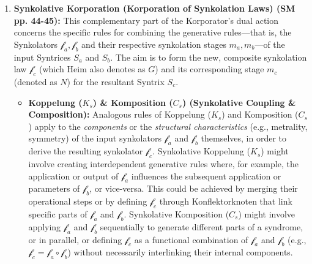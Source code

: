 \documentclass[12pt]{article}
\newcommand{\metrophor}{\bm{\widetilde{a}}}
\newcommand{\synkolator}{\mathcal{f}}
\newcommand{\synkolationsstufe}{m}
\newcommand{\aspektivsystem}{P}
\newcommand{\subjektiveraspekt}{S}
\begin{document}
\begin{itemize}
\begin{enumerate}
\begin{itemize}
            \item \textbf{Notation for Metrophorkorporation (SM p. 44):} Heim denotes the metrophoric part of the overall corporation process using the notation \( \metrophor_a \{K_m C_m\} \metrophor_b, \overline{|\aspektivsystem_C \subjektiveraspekt|}_\gamma, \metrophor_c \). The operator matrix \( \{K_m C_m\} \) here signifies the combined set of metrophoric rules being applied. In the context of the full \( 2 \times 2 \) Korporator operator matrix (as will be shown in Eq. \eqref{eq:korporator_matrix_original}), the Koppelung rule \( K_m \) is conventionally placed in the bottom-left position, and the Komposition rule \( C_m \) is placed in the bottom-right position.
        \end{itemize}

        \item \textbf{Synkolative Korporation (Korporation of Synkolation Laws) (SM pp. 44-45):} This complementary part of the Korporator's dual action concerns the specific rules for combining the generative rules—that is, the Synkolators \( \synkolator_a, \synkolator_b \) and their respective synkolation stages \( \synkolationsstufe_a, \synkolationsstufe_b \)—of the input Syntrices \( S_a \) and \( S_b \). The aim is to form the new, composite synkolation law \( \synkolator_c \) (which Heim also denotes as \(G\)) and its corresponding stage \( \synkolationsstufe_c \) (denoted as \(N\)) for the resultant Syntrix \( S_c \).
        \begin{itemize}
            \item \textbf{Koppelung (\( K_s \)) \& Komposition (\( C_s \)) (Synkolative Coupling \& Composition):} Analogous rules of Koppelung (\( K_s \)) and Komposition (\( C_s \)) apply to the \textit{components} or the \textit{structural characteristics} (e.g., metrality, symmetry) of the input synkolators \( \synkolator_a \) and \( \synkolator_b \) themselves, in order to derive the resulting synkolator \( \synkolator_c \). Synkolative Koppelung (\( K_s \)) might involve creating interdependent generative rules where, for example, the application or output of \( \synkolator_a \) influences the subsequent application or parameters of \( \synkolator_b \), or vice-versa. This could be achieved by merging their operational steps or by defining \( \synkolator_c \) through Konflektorknoten that link specific parts of \( \synkolator_a \) and \( \synkolator_b \). Synkolative Komposition (\( C_s \)) might involve applying \( \synkolator_a \) and \( \synkolator_b \) sequentially to generate different parts of a syndrome, or in parallel, or defining \( \synkolator_c \) as a functional combination of \( \synkolator_a \) and \( \synkolator_b \) (e.g., \( \synkolator_c = \synkolator_a \circ \synkolator_b \)) without necessarily interlinking their internal components.

\end{itemize}
\end{enumerate}
\end{itemize}
\end{document}

